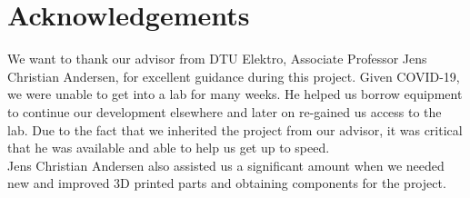 \chapter{Acknowledgements}
We want to thank our advisor from DTU Elektro, Associate Professor Jens Christian Andersen, for excellent guidance during this project. Given COVID-19, we were unable to get into a lab for many weeks. He helped us borrow equipment to continue our development elsewhere and later on re-gained us access to the lab. Due to the fact that we inherited the project from our advisor, it was critical that he was available and able to help us get up to speed. \\
Jens Christian Andersen also assisted us a significant amount when we needed new and improved 3D printed parts and obtaining components for the project. 